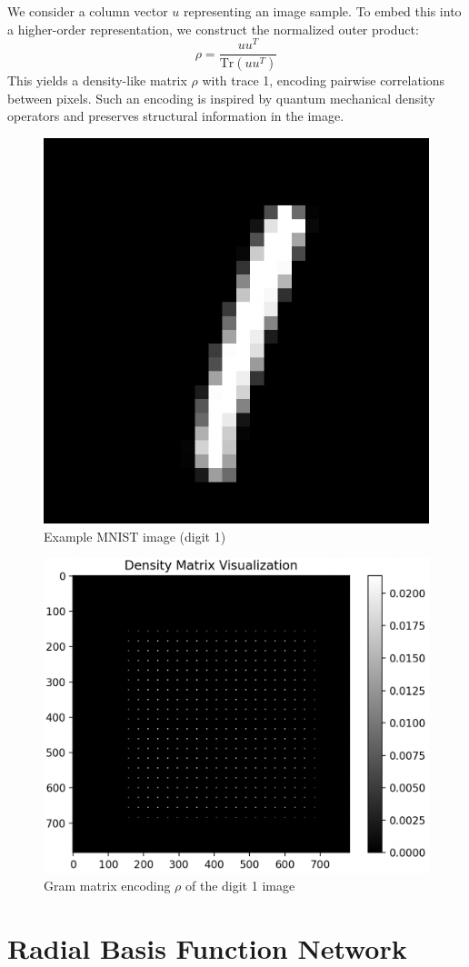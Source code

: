 \documentclass[twocolumn]{article} %
\begin{document}
We consider a column vector $u$ representing an image sample. To embed this into a higher-order representation, we construct the normalized outer product:
\[
\rho = \frac{uu^T}{\text{Tr}(uu^T)}
\]
This yields a density-like matrix $\rho$ with trace 1, encoding pairwise correlations between pixels. Such an encoding is inspired by quantum mechanical density operators and preserves structural information in the image.

\begin{figure}[h!]
    \centering
    \includegraphics[width=0.6\linewidth]{figures/nmist_1_data.png}
    \caption{Example MNIST image (digit 1)}
    \label{fig:dataset_one}
\end{figure}

\begin{figure}[h!]
    \centering
    \includegraphics[width=0.6\linewidth]{figures/density_matrix_nmist_one.png}
    \caption{Gram matrix encoding $\rho$ of the digit 1 image}
    \label{fig:density_matrix}
\end{figure}

\section{Radial Basis Function Network}
\end{document}
